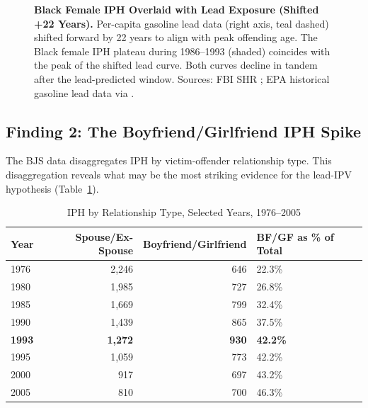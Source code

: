 \documentclass[12pt, letterpaper]{article}
\begin{document}
\begin{figure}[H]
\caption{\textbf{Black Female IPH Overlaid with Lead Exposure (Shifted +22 Years).} Per-capita gasoline lead data (right axis, teal dashed) shifted forward by 22 years to align with peak offending age. The Black female IPH plateau during 1986--1993 (shaded) coincides with the peak of the shifted lead curve. Both curves decline in tandem after the lead-predicted window. Sources: FBI SHR \citep{fox2007}; EPA historical gasoline lead data via \citet{nevin2007}.}
\label{fig:bf_iph_lead}
\end{figure}

\subsection{Finding 2: The Boyfriend/Girlfriend IPH Spike}

The BJS data disaggregates IPH by victim-offender relationship type. This disaggregation reveals what may be the most striking evidence for the lead-IPV hypothesis (Table~\ref{tab:bf_gf}).

\begin{table}[H]
\centering
\caption{IPH by Relationship Type, Selected Years, 1976--2005}
\label{tab:bf_gf}
\begin{tabular}{lrrl}
\toprule
\textbf{Year} & \textbf{Spouse/Ex-Spouse} & \textbf{Boyfriend/Girlfriend} & \textbf{BF/GF as \% of Total} \\
\midrule
1976 & 2,246 & 646 & 22.3\% \\
1980 & 1,985 & 727 & 26.8\% \\
1985 & 1,669 & 799 & 32.4\% \\
1990 & 1,439 & 865 & 37.5\% \\
\textbf{1993} & \textbf{1,272} & \textbf{930} & \textbf{42.2\%} \\
1995 & 1,059 & 773 & 42.2\% \\
2000 & 917 & 697 & 43.2\% \\
2005 & 810 & 700 & 46.3\% \\
\bottomrule
\end{tabular}
\end{table}
\end{document}
